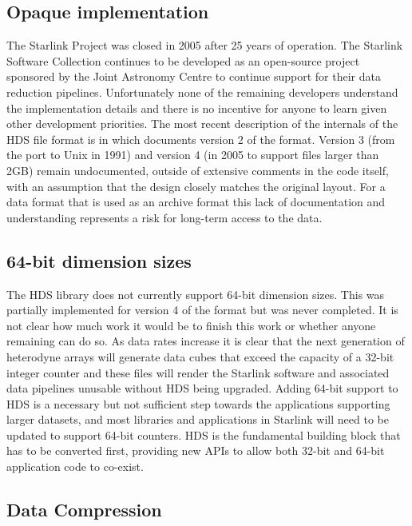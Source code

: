 \documentclass[final,authoryear,5p,times,twocolumn]{elsarticle}
\begin{document}
\subsection{Opaque implementation}

The Starlink Project was closed in 2005 after 25 years of
operation. The Starlink Software Collection continues to be developed
as an open-source project sponsored by the Joint Astronomy Centre to
continue support for their data reduction pipelines. Unfortunately
none of the remaining developers understand the implementation details and there is
no incentive for anyone to learn given other development priorities. The most recent description of the
internals of the HDS file format is in \citet{SSN27a} which documents
version 2 of the format. Version 3 (from the port to Unix in 1991) and
version 4 (in 2005 to support files larger than 2GB) remain
undocumented, outside of extensive comments in the code itself,
with an assumption that the design closely matches the
original layout. For a data format that is used as an archive format
\citep[see e.g.,][]{2015Economou} this lack of documentation and understanding
represents a risk for long-term access to the data.

\subsection{64-bit dimension sizes}

The HDS library does not currently support 64-bit dimension
sizes. This was partially implemented for version 4 of the format but
was never completed. It is not clear how much work it would be to finish
this work or whether anyone remaining can do so. As data rates
increase it is clear that the next generation of heterodyne arrays
\citep[e.g.,][]{2014SPIE.9152E..2WJ} will generate data cubes that exceed
the capacity of a 32-bit integer counter and these files will render
the Starlink software and associated data pipelines unusable without
HDS being upgraded. Adding 64-bit support to HDS is a necessary but
not sufficient step towards the applications supporting larger
datasets, and most libraries and applications in Starlink will
need to be updated to support 64-bit counters. HDS is the
fundamental building block that has to be converted first, providing
new APIs to allow both 32-bit and 64-bit application code to co-exist.

\subsection{Data Compression}
\end{document}
